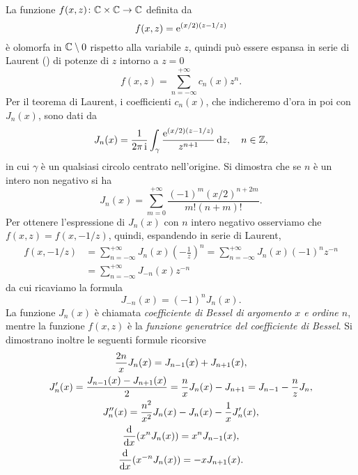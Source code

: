 La funzione $f(x,z)\colon\mathbb{C}\times\mathbb{C}\to\mathbb{C}$ definita da
\begin{equation}
  f(x,z) = \operatorname{\mathrm{e}}^{(x/2)(z - 1/z)}
\end{equation}
è olomorfa in $\mathbb{C}\setminus 0$ rispetto alla variabile $z$, quindi può essere
espansa in serie di Laurent (\textcite{demarco:analisi2}) di potenze di $z$
intorno a $z=0$
\begin{equation}
  f(x,z) = \sum_{n = -\infty}^{+\infty} c_n(x) z^n.
\end{equation}
Per il teorema di Laurent, i coefficienti $c_n(x)$, che indicheremo d'ora in poi
con $J_n(x)$, sono dati da
\begin{equation}
  J_n(x) = \frac{1}{2\pi\operatorname{\mathrm{i}}}\int_\gamma \frac{\operatorname{\mathrm{e}}^{(x/2)(z-1/z)}}{z^{n+1}}\mathop{}\!\mathrm{d} z,
  \quad n\in\mathbb{Z},
\end{equation}
in cui $\gamma$ è un qualsiasi circolo centrato nell'origine. Si dimostra che se
$n$ è un intero non negativo si ha
\begin{equation}
  J_n (x) = \sum_{m = 0}^{+\infty}\frac{(-1)^m(x/2)^{n+2m}}{m!(n+m)!}.
\end{equation}
Per ottenere l'espressione di $J_n(x)$ con $n$ intero negativo osserviamo che
$f(x,z) = f(x,-1/z)$, quindi, espandendo in serie di Laurent,
\begin{equation}
  \begin{split}
    f(x,-1/z) &= \sum_{n = -\infty}^{+\infty}J_n(x)
    \left(
      -\frac{1}{z}
    \right)^n = \sum_{n = -\infty}^{+\infty}J_n(x)(-1)^nz^{-n} \\
    &= \sum_{n = -\infty}^{+\infty}J_{-n}(x)z^{-n}
  \end{split}
\end{equation}
da cui ricaviamo la formula
\begin{equation}
  J_{-n}(x) = (-1)^nJ_n(x).
\end{equation}
La funzione $J_n(x)$ è chiamata \emph{coefficiente di Bessel di argomento $x$ e
  ordine $n$}, mentre la funzione $f(x,z)$ è la \emph{funzione generatrice del
  coefficiente di Bessel}. Si dimostrano inoltre le seguenti formule ricorsive
\begin{subequations}
  \begin{gather}
    \frac{2n}{x} J_n(x) = J_{n-1}(x) + J_{n+1}(x),\\
    J_n'(x) = \frac{J_{n-1}(x) - J_{n+1}(x)}{2} = \frac{n}{x}J_n(x) - J_{n+1} =
    J_{n-1} - \frac{n}{z}J_n,\\
    J_n''(x) = \frac{n^2}{x^2}J_n(x) - J_n(x) - \frac{1}{x}J_n'(x),\\
    \frac{{\mathop{}\!\mathrm{d}^{}}}{\mathop{}\!\mathrm{d} {x}^{}}(x^nJ_n(x)) = x^nJ_{n-1}(x),\\
    \frac{{\mathop{}\!\mathrm{d}^{}}}{\mathop{}\!\mathrm{d} {x}^{}}(x^{-n}J_n(x)) = -xJ_{n+1}(x).
  \end{gather}
\end{subequations}
